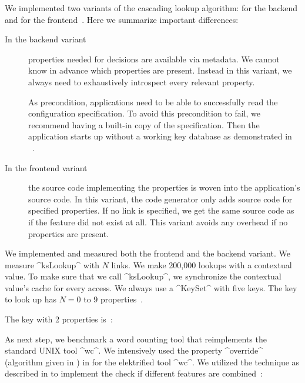 We implemented two variants of the cascading lookup algorithm: for the backend and for the frontend~\cite{raab2015kps}.
Here we summarize important differences:
\begin{description}
\item[In the backend variant]
properties needed for decisions are available via metadata.
We cannot know in advance which properties are present.
Instead in this variant, we always need to exhaustively introspect every relevant property.

As precondition, applications need to be able to successfully read the configuration specification.
To avoid this precondition to fail, we recommend having a built-in copy of the specification.
Then the application starts up without a working key database as demonstrated in ~\cite{raab2015kps}.

\item[In the frontend variant]
the source code implementing the properties is woven into the application's source code.
In this variant, the code generator only adds source code for specified properties.
If no link is specified, we get the same source code as if the feature did not exist at all.
This variant avoids any overhead if no properties are present.
\end{description}

We implemented and measured both the frontend and the backend variant.
We measure ^ksLookup^ with $N$  links.
We make 200,000 lookups with a contextual value.
To make sure that we call ^ksLookup^, we synchronize the contextual value's cache for every access.
We always use a ^KeySet^ with five keys.
The key to look up has $N=0$ to $9$  properties~\cite{raab2015kps}.

\begin{example}
The key with 2 properties  is~\cite{raab2015kps}:

\end{example}

As next step, we benchmark a word counting tool that reimplements the standard UNIX tool ^wc^.
We intensively used the property ^override^ (algorithm given in ) in  for the elektrified tool ^wc^.
We utilized the technique as described in  to implement the check if different features are combined~\cite{raab2015kps}:


